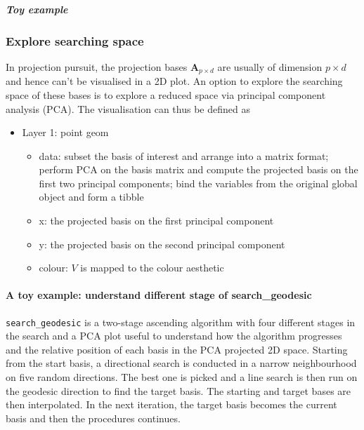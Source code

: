 \documentclass[12pt]{article}
\providecommand{\tightlist}{%
  \setlength{\itemsep}{0pt}\setlength{\parskip}{0pt}}
\begin{document}
\hypertarget{toy-example}{%
\subparagraph{Toy example}\label{toy-example}}

\hypertarget{explore-searching-space}{%
\subsubsection{Explore searching space}\label{explore-searching-space}}

In projection pursuit, the projection bases \(\mathbf{A}_{p \times d}\)
are usually of dimension \(p \times d\) and hence can't be visualised in
a 2D plot. An option to explore the searching space of these bases is to
explore a reduced space via principal component analysis (PCA). The
visualisation can thus be defined as

\begin{itemize}
\tightlist
\item
  Layer 1: point geom

  \begin{itemize}
  \tightlist
  \item
    data: subset the basis of interest and arrange into a matrix format;
    perform PCA on the basis matrix and compute the projected basis on
    the first two principal components; bind the variables from the
    original global object and form a tibble
  \item
    x: the projected basis on the first principal component
  \item
    y: the projected basis on the second principal component
  \item
    colour: \(V\) is mapped to the colour aesthetic
  \end{itemize}
\end{itemize}

\hypertarget{a-toy-example-understand-different-stage-of-search_geodesic}{%
\paragraph{A toy example: understand different stage of
search\_geodesic}\label{a-toy-example-understand-different-stage-of-search_geodesic}}

\texttt{search\_geodesic} is a two-stage ascending algorithm with four
different stages in the search and a PCA plot useful to understand how
the algorithm progresses and the relative position of each basis in the
PCA projected 2D space. Starting from the start basis, a directional
search is conducted in a narrow neighbourhood on five random directions.
The best one is picked and a line search is then run on the geodesic
direction to find the target basis. The starting and target bases are
then interpolated. In the next iteration, the target basis becomes the
current basis and then the procedures continues.
\end{document}
